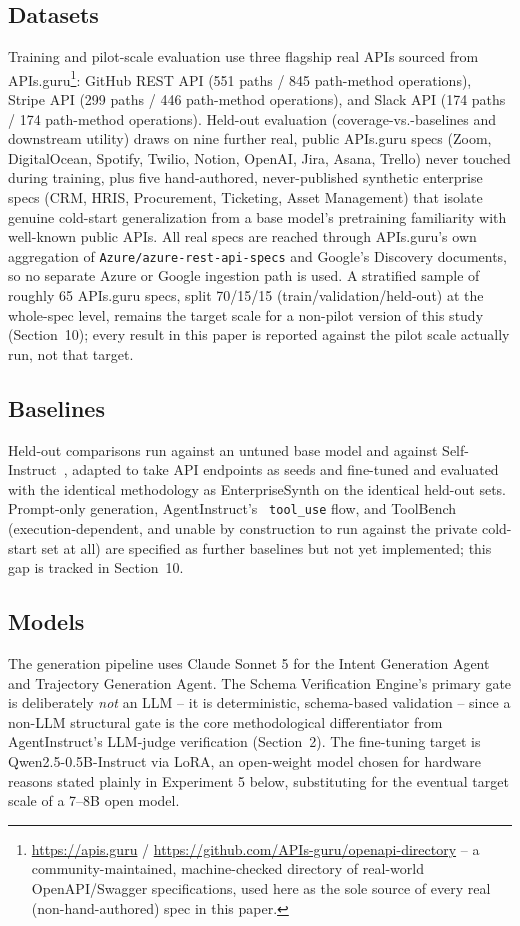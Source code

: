\documentclass[11pt]{article}
\begin{document}
\subsection{Datasets}
Training and pilot-scale evaluation use three flagship real APIs sourced from
APIs.guru\footnote{\url{https://apis.guru} / \url{https://github.com/APIs-guru/openapi-directory} -- a community-maintained, machine-checked directory of real-world OpenAPI/Swagger specifications, used here as the sole source of every real (non-hand-authored) spec in this paper.}: GitHub
REST API (551 paths / 845 path-method operations), Stripe API (299 paths / 446 path-method operations),
and Slack API (174 paths / 174 path-method operations). Held-out evaluation (coverage-vs.-baselines
and downstream utility) draws on nine further real, public APIs.guru specs (Zoom, DigitalOcean, Spotify, Twilio,
Notion, OpenAI, Jira, Asana, Trello) never touched during training, plus five hand-authored,
never-published synthetic enterprise specs (CRM, HRIS, Procurement, Ticketing, Asset Management)
that isolate genuine cold-start generalization from a base model's pretraining familiarity with
well-known public APIs. All real specs are reached through APIs.guru's own aggregation of
\texttt{Azure/azure-rest-api-specs} and Google's Discovery documents, so no separate Azure or
Google ingestion path is used. A stratified sample of roughly 65 APIs.guru specs, split
70/15/15 (train/validation/held-out) at the whole-spec level, remains the target scale for a
non-pilot version of this study (Section~10); every result in this paper is reported against the
pilot scale actually run, not that target.

\subsection{Baselines}
Held-out comparisons run against an untuned base model and against
Self-Instruct~\cite{wang2022selfinstruct}, adapted to take API endpoints as seeds and fine-tuned
and evaluated with the identical methodology as EnterpriseSynth on the identical held-out sets.
Prompt-only generation, AgentInstruct's~\cite{mitra2024agentinstruct} \texttt{tool\_use} flow, and
ToolBench~\cite{qin2023toolbench} (execution-dependent, and unable by construction to run against
the private cold-start set at all) are specified as further baselines but not yet implemented;
this gap is tracked in Section~10.

\subsection{Models}
The generation pipeline uses Claude Sonnet 5 for the Intent Generation Agent and Trajectory
Generation Agent. The Schema Verification Engine's primary gate is deliberately \textit{not} an
LLM -- it is deterministic, schema-based validation -- since a non-LLM structural gate is the core
methodological differentiator from AgentInstruct's LLM-judge verification (Section~2). The
fine-tuning target is Qwen2.5-0.5B-Instruct via LoRA, an open-weight model chosen for hardware
reasons stated plainly in Experiment 5 below, substituting for the eventual target scale of a
7--8B open model.
\end{document}
